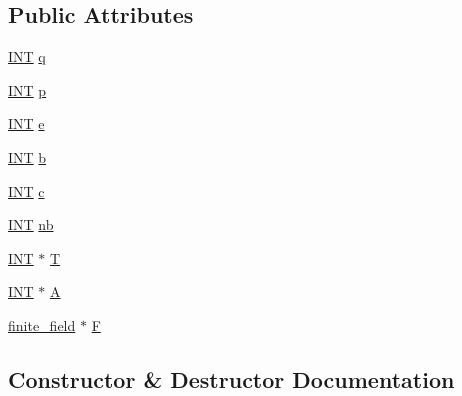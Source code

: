 \subsection*{Public Attributes}
\begin{DoxyCompactItemize}
\item 
\mbox{\hyperlink{galois_8h_a09fddde158a3a20bd2dcadb609de11dc}{I\+NT}} \mbox{\hyperlink{classelliptic__curve_a89ca852ca743b5523e754aa1b5b90496}{q}}
\item 
\mbox{\hyperlink{galois_8h_a09fddde158a3a20bd2dcadb609de11dc}{I\+NT}} \mbox{\hyperlink{classelliptic__curve_a7ddc1196eb8f45d85dfad3171831ab1c}{p}}
\item 
\mbox{\hyperlink{galois_8h_a09fddde158a3a20bd2dcadb609de11dc}{I\+NT}} \mbox{\hyperlink{classelliptic__curve_a0d7ba46a2a9484d27989ea71ab769ae6}{e}}
\item 
\mbox{\hyperlink{galois_8h_a09fddde158a3a20bd2dcadb609de11dc}{I\+NT}} \mbox{\hyperlink{classelliptic__curve_ade70b18ed97add66f8811cb584ad1915}{b}}
\item 
\mbox{\hyperlink{galois_8h_a09fddde158a3a20bd2dcadb609de11dc}{I\+NT}} \mbox{\hyperlink{classelliptic__curve_a540307713774a2f3b7aaf5ffabeb1678}{c}}
\item 
\mbox{\hyperlink{galois_8h_a09fddde158a3a20bd2dcadb609de11dc}{I\+NT}} \mbox{\hyperlink{classelliptic__curve_a7ace4da8285026af8c6bfd0253ff614b}{nb}}
\item 
\mbox{\hyperlink{galois_8h_a09fddde158a3a20bd2dcadb609de11dc}{I\+NT}} $\ast$ \mbox{\hyperlink{classelliptic__curve_aa6d73dc15171e7a096ebbdf3aaed5319}{T}}
\item 
\mbox{\hyperlink{galois_8h_a09fddde158a3a20bd2dcadb609de11dc}{I\+NT}} $\ast$ \mbox{\hyperlink{classelliptic__curve_ac8f4568dc59a3f03bf5b4b320cae56a6}{A}}
\item 
\mbox{\hyperlink{classfinite__field}{finite\+\_\+field}} $\ast$ \mbox{\hyperlink{classelliptic__curve_a2b4a8140101de7fe21ef774497372c94}{F}}
\end{DoxyCompactItemize}


\subsection{Constructor \& Destructor Documentation}
\mbox{\label{classelliptic__curve_ae1ce376e47410f2845e5fd3c59b5296d}} 
